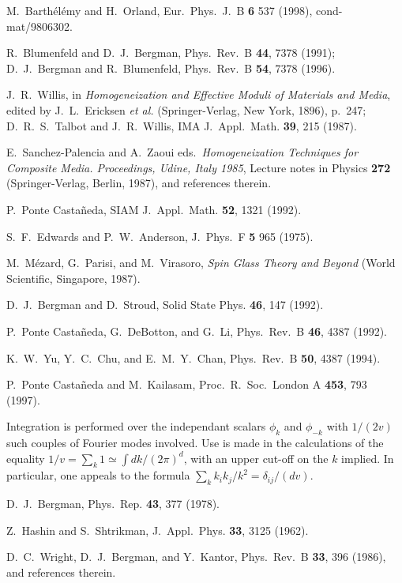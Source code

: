 \begin{references}
 M.~Barth\'el\'emy and H.~Orland, Eur.\ Phys.\ J.\ B
{\bf 6} 537 (1998), cond-mat/9806302.

 R.~Blumenfeld and D.~J.~Bergman, Phys.\ Rev.\ B {\bf
44}, 7378 (1991); D.~J.~Bergman and R.~Blumenfeld, Phys.\ Rev.\ B {\bf
54}, 7378 (1996).

 J.~R.~Willis, in {\it Homogeneization and Effective Moduli 
of Materials and Media}, edited by J.~L.~Ericksen {\it et al.} 
(Springer-Verlag, New York, 1896), p.\ 247; D.~R.~S.~Talbot and J.~R.~Willis, 
IMA J.\ Appl.\ Math. {\bf 39}, 215 (1987).

 E.\ Sanchez-Palencia and A.\ Zaoui eds.\, 
{\em Homogeneization Techniques for Composite Media. Proceedings, Udine, 
Italy 1985}, Lecture notes in Physics {\bf 272} (Springer-Verlag, Berlin, 
1987), and references therein.

 P.~Ponte Casta\~neda, SIAM J.\ Appl.\ Math. {\bf
52}, 1321 (1992).

 S.~F.~Edwards and P.~W.~Anderson, J.\ Phys.\ F {\bf
5} 965 (1975).

 M.~M\'ezard, G.~Parisi, and M.~Virasoro, {\it
Spin Glass Theory and Beyond} (World Scientific, Singapore, 1987).

 D.~J.~Bergman and D.~Stroud, Solid State Phys.  {\bf
46}, 147 (1992).

 P.~Ponte Casta\~neda, G.~DeBotton, and G.~Li, Phys.\
Rev.\ B {\bf 46}, 4387 (1992).

 K.~W.~Yu, Y.~C.~Chu, and E.~M.~Y.~Chan, Phys.\ Rev.\ B
{\bf 50}, 4387 (1994).

 P.~Ponte Casta\~neda and M.\ Kailasam, Proc.\ R.\
Soc.\ London A {\bf 453}, 793 (1997).

 Integration is performed over the independant scalars 
$\phi_k$ and $\phi_{-k}$ with $1/(2v)$ such couples of Fourier modes 
involved. Use is made in the calculations of the 
equality $1/v=\sum_k 1\simeq\int dk /(2\pi)^d$, with an 
upper cut-off on the $k$ implied. In particular, one appeals 
to the formula $\sum_k k_i k_j/k^2=\delta_{ij}/(dv)$.

 D.~J.~Bergman, Phys.\ Rep. {\bf 43}, 377 (1978).

\bibitem{HASH62} Z.~Hashin and S.~Shtrikman, J.\ Appl.\ Phys. 
{\bf 33}, 3125 (1962).

 D.\ C.\ Wright, D.\ J.\ Bergman, and Y.\ Kantor, 
Phys.\ Rev.\ B {\bf 33}, 396 (1986), and references therein.


\end{references}

